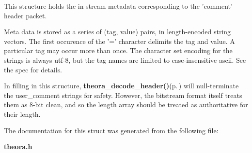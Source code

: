 This structure holds the in-stream metadata corresponding to the 'comment' header packet.

Meta data is stored as a series of (tag, value) pairs, in length-encoded string vectors. The first occurence of the '=' character delimits the tag and value. A particular tag may occur more than once. The character set encoding for the strings is always utf-8, but the tag names are limited to case-insensitive ascii. See the spec for details.

In filling in this structure, {\bf theora\_\-decode\_\-header()}{\rm (p.\,\pageref{theora_8h_a21})} will null-terminate the user\_\-comment strings for safety. However, the bitstream format itself treats them as 8-bit clean, and so the length array should be treated as authoritative for their length. 



The documentation for this struct was generated from the following file:\begin{CompactItemize}
\item 
{\bf theora.h}\end{CompactItemize}
